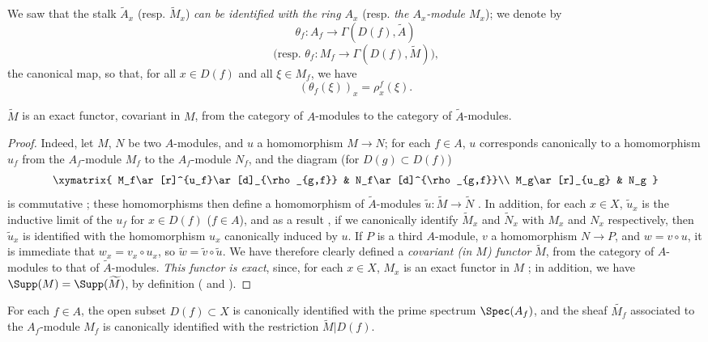 We saw  that the stalk $\widetilde{A}_x$ (resp. $\widetilde{M}_x$) \emph{can be identified with the ring $A_x$} (resp. \emph{the $A_x$-module $M_x$});
we denote by
\[
  \theta_f:A_f\to\Gamma(D(f),\widetilde{A})
\]
\[
  \text{(resp. }\theta_f:M_f\to\Gamma(D(f),\widetilde{M})\text{),}
\]
the canonical map, so that, for all $x\in D(f)$ and all $\xi\in M_f$, we have
\[
  (\theta_f(\xi))_x=\rho_x^f(\xi).
  \tag{1.3.4.1}
  \label{I.1.3.4.1}
\]

\begin{proposition}[1.3.5]
\label{I.1.3.5}
$\widetilde{M}$ is an exact functor, covariant in $M$, from the category of $A$-modules to the category of $\widetilde{A}$-modules.
\end{proposition}

\begin{proof}
Indeed, let $M$, $N$ be two $A$-modules, and $u$ a homomorphism $M\to N$;
for each $f\in A$, $u$ corresponds canonically to a homomorphism $u_f$ from the $A_f$-module $M_f$ to the $A_f$-module $N_f$, and the diagram (for $D(g)\subset D(f)$)
\[
  \xymatrix{
    M_f\ar[r]^{u_f}\ar[d]_{\rho_{g,f}} & N_f\ar[d]^{\rho_{g,f}}\\
    M_g\ar[r]_{u_g} & N_g
  }
\]
is commutative ;
these homomorphisms then define a homomorphism of $\widetilde{A}$-modules $\widetilde{u}:\widetilde{M}\to\widetilde{N}$ .
In addition, for each $x\in X$, $\widetilde{u}_x$ is the inductive limit of the $u_f$ for $x\in D(f)$ ($f\in A$), and as a result , if we canonically identify $\widetilde{M}_x$ and $\widetilde{N}_x$ with $M_x$ and $N_x$ respectively, then $\widetilde{u}_x$ is identified with the homomorphism $u_x$ canonically induced by $u$.
If $P$ is a third $A$-module, $v$ a homomorphism $N\to P$, and $w=v\circ u$, it is immediate that $w_x=v_x\circ u_x$, so $\widetilde{w}=\widetilde{v}\circ\widetilde{u}$.
We have therefore clearly defined a \emph{covariant (in $M$) functor} $\widetilde{M}$, from the category of $A$-modules to that of $\widetilde{A}$-modules.
\emph{This functor is exact}, since, for each $x\in X$, $M_x$ is an exact functor in $M$ ;
in addition, we have $\Supp(M)=\Supp(\widetilde{M})$, by definition ( and ).
\end{proof}

\begin{proposition}[1.3.6]
\label{I.1.3.6}
For each $f\in A$, the open subset $D(f)\subset X$ is canonically identified with the prime spectrum $\Spec(A_f)$, and the sheaf $\widetilde{M_f}$ associated to the $A_f$-module $M_f$ is canonically identified with the restriction $\widetilde{M}|D(f)$.
\end{proposition}

